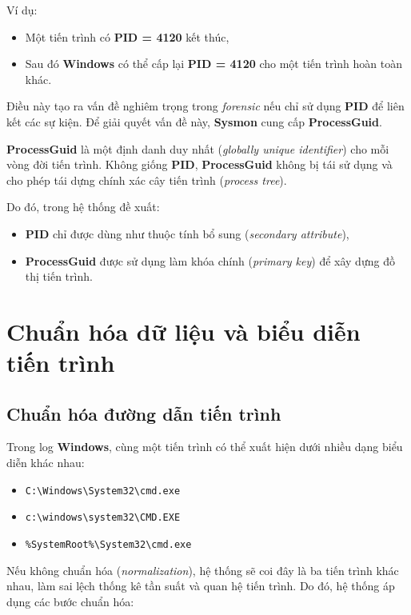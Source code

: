 \documentclass[../main.tex]{subfiles}
\begin{document}
Ví dụ:
\begin{itemize}
    \item Một tiến trình có \textbf{PID = 4120} kết thúc,
    \item Sau đó \textbf{Windows} có thể cấp lại \textbf{PID = 4120} cho một tiến trình hoàn toàn khác.
\end{itemize}

Điều này tạo ra vấn đề nghiêm trọng trong \textit{forensic} nếu chỉ sử dụng \textbf{PID} để liên kết các sự kiện. Để giải quyết vấn đề này, \textbf{Sysmon} cung cấp \textbf{ProcessGuid}.

\textbf{ProcessGuid} là một định danh duy nhất (\textit{globally unique identifier}) cho mỗi vòng đời tiến trình. Không giống \textbf{PID}, \textbf{ProcessGuid} không bị tái sử dụng và cho phép tái dựng chính xác cây tiến trình (\textit{process tree}).

Do đó, trong hệ thống đề xuất:
\begin{itemize}
    \item \textbf{PID} chỉ được dùng như thuộc tính bổ sung (\textit{secondary attribute}),
    \item \textbf{ProcessGuid} được sử dụng làm khóa chính (\textit{primary key}) để xây dựng đồ thị tiến trình.
\end{itemize}

\section{Chuẩn hóa dữ liệu và biểu diễn tiến trình}
\label{section:2.2}

\subsection{Chuẩn hóa đường dẫn tiến trình}
\label{subsection:2.2.1}
Trong log \textbf{Windows}, cùng một tiến trình có thể xuất hiện dưới nhiều dạng biểu diễn khác nhau:
\begin{itemize}
    \item \texttt{C:\textbackslash Windows\textbackslash System32\textbackslash cmd.exe}
    \item \texttt{c:\textbackslash windows\textbackslash system32\textbackslash CMD.EXE}
    \item \texttt{\%SystemRoot\%\textbackslash System32\textbackslash cmd.exe}
\end{itemize}

Nếu không chuẩn hóa (\textit{normalization}), hệ thống sẽ coi đây là ba tiến trình khác nhau, làm sai lệch thống kê tần suất và quan hệ tiến trình. Do đó, hệ thống áp dụng các bước chuẩn hóa:
\end{document}
